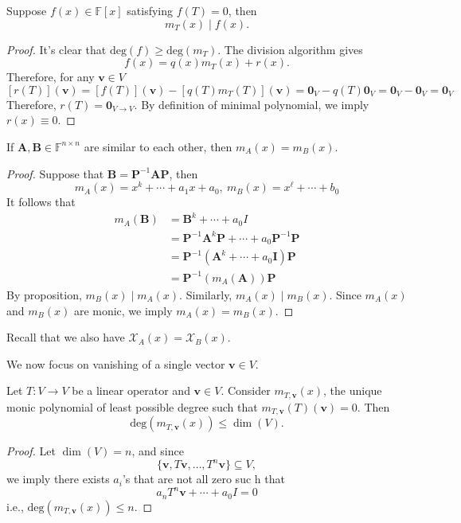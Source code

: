 \begin{proposition}
Suppose $f(x)\in\mathbb{F}[x]$ satisfying $f(T)=0$, then
\[
m_T(x)\mid f(x).
\]
\end{proposition}
\begin{proof}
It's clear that $\text{deg}(f)\ge\text{deg}(m_T)$.
The division algorithm gives 
\[
f(x)=q(x)m_T(x)+r(x).
\]
Therefore, for any $\bm v\in V$
\[
[r(T)](\bm v) = [f(T)](\bm v) - [q(T)m_T(T)](\bm v)=\bm0_V-q(T)\bm0_{V}=\bm0_V-\bm0_V=\bm0_{V}
\]
Therefore, $r(T) = \bm0_{V\to V}$.
By definition of minimal polynomial, we imply $r(x)\equiv0$.
\end{proof}
\begin{proposition}
If $\bm A,\bm B\in\mathbb{F}^{n\times n}$ are similar to each other, then $m_A(x) = m_B(x)$.
\end{proposition}
\begin{proof}
Suppose that $\bm B= \bm P^{-1}\bm A\bm P$, 
then 
\[
m_A(x)=x^k+\cdots+a_1x+a_0,\
m_B(x)=x^{\ell}+\cdots+b_0
\]
It follows that
\begin{align*}
m_A(\bm B)&=\bm B^k+\cdots+a_0I\\
&=\bm P^{-1}\bm A^k\bm P+\cdots+a_0\bm P^{-1}\bm P\\
&=\bm P^{-1}(\bm A^k+\cdots+a_0\bm I)\bm P\\
&=\bm P^{-1}(m_{A}(\bm A))\bm P
\end{align*}
By proposition, $m_{B}(x)\mid m_{A}(x)$. Similarly, $m_A(x)\mid m_B(x)$. Since $m_A(x)$ and $m_B(x)$ are monic, we imply $m_A(x)=m_B(x)$.
\end{proof}
Recall that we also have $\mathcal{X}_A(x) = \mathcal{X}_B(x)$.

We now focus on vanishing of a single vector $\bm v\in V$.
\begin{proposition}
Let $T:V\to V$ be a linear operator and $\bm v\in V$.
Consider $m_{T,\bm v}(x)$, the unique monic polynomial of least possible degree such that $m_{T,\bm v}(T)(\bm v)=0$. Then
\[
\text{deg}(m_{T,\bm v}(x))\le \dim (V).
\]
\end{proposition}
\begin{proof}
Let $\dim(V)=n$, and since
\[
\{\bm v,T\bm v,\dots,T^n\bm v\}\subseteq V,
\]
we imply there exists $a_i$'s that are not all zero suc h that
\[
a_nT^n\bm v+\cdots+a_0I=0
\]
i.e., $\text{deg}(m_{T,\bm v}(x))\le n$.
\end{proof}

